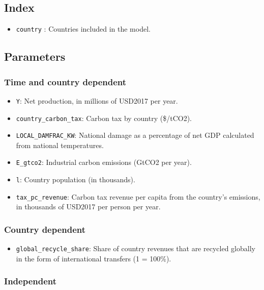 \documentclass[
]{article}
\providecommand{\tightlist}{%
  \setlength{\itemsep}{0pt}\setlength{\parskip}{0pt}}
\begin{document}
\subsection{Index}\label{index-2}

\begin{itemize}
\tightlist
\item
  \texttt{country} : Countries included in the model.
\end{itemize}

\subsection{Parameters}\label{parameters-6}

\subsubsection{Time and country
dependent}\label{time-and-country-dependent-12}

\begin{itemize}
\tightlist
\item
  \texttt{Y}: Net production, in millions of USD2017 per year.
\item
  \texttt{country\_carbon\_tax}: Carbon tax by country (\$/tCO2).
\item
  \texttt{LOCAL\_DAMFRAC\_KW}: National damage as a percentage of net
  GDP calculated from national temperatures.
\item
  \texttt{E\_gtco2}: Industrial carbon emissions (GtCO2 per year).
\item
  \texttt{l}: Country population (in thousands).
\item
  \texttt{tax\_pc\_revenue}: Carbon tax revenue per capita from the
  country's emissions, in thousands of USD2017 per person per year.
\end{itemize}

\subsubsection{Country dependent}\label{country-dependent-3}

\begin{itemize}
\tightlist
\item
  \texttt{global\_recycle\_share}: Share of country revenues that are
  recycled globally in the form of international transfers (1 = 100\%).
\end{itemize}

\subsubsection{Independent}\label{Independent-20}
\end{document}
